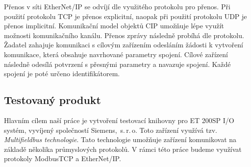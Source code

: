 Přenos v síti EtherNet/IP se odvíjí dle využitého protokolu pro přenos. Při použití protokolu TCP je přenos explicitní, naopak při použití protokolu UDP je přenos implicitní. Komunikační model objektů CIP umožňuje lépe využít možnosti komunikačního kanálu. Přenos zprávy následně probíhá dle protokolu. Žadatel zahajuje komunikaci s cílovým zařízením odesláním žádosti k vytvoření komunikace, která obsahuje navrhované parametry spojení. Cílové zařízení následně odesílá potvrzení s přesnými parametry a navazuje spojení. Každé spojení je poté určeno identifikátorem. \cite{ethernet_ip}

\subsection{Testovaný produkt}
Hlavním cílem naší práce je vytvoření testovací knihovny pro ET 200SP I/O systém, vyvíjený společností Siemens,~s.\,{}r.\,{}o. Toto zařízení využívá tzv. \textit{Multifieldbus technologie}. Tato technologie umožňuje zařízení komunikovat na základě několika průmyslových protokolů. V rámci této práce budeme využívat protokoly ModbusTCP a EtherNet/IP. 

